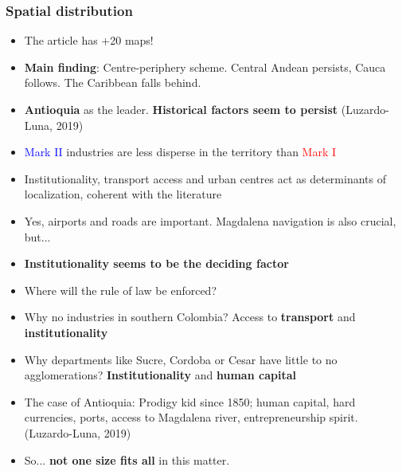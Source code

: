 \documentclass{beamer}
\begin{document}
	\begin{frame}[allowframebreaks]
		\frametitle{Spatial distribution}
		\begin{itemize}
			\item The article has +20 maps!
			\item \textbf{Main finding}: Centre-periphery scheme. Central Andean persists, Cauca follows. The Caribbean falls behind.
			\item \textbf{Antioquia} as the leader. \textbf{Historical factors seem to persist} (Luzardo-Luna, 2019)
			\item \textcolor{blue}{Mark II} industries are less disperse in the territory than \textcolor{red}{Mark I}
			\item Institutionality, transport access and urban centres act as determinants of localization, coherent with the literature
			\item Yes, airports and roads are important. Magdalena navigation is also crucial, but...
			\framebreak
			\item \textbf{Institutionality seems to be the deciding factor}
			\item Where will the rule of law be enforced?
			\item Why no industries in southern Colombia? Access to \textbf{transport} and \textbf{institutionality}
			\item Why departments like Sucre, Cordoba or Cesar have little to no agglomerations? \textbf{Institutionality} and \textbf{human capital}
			\item The case of Antioquia: Prodigy kid since 1850; human capital, hard currencies, ports, access to Magdalena river, entrepreneurship spirit. (Luzardo-Luna, 2019)
			\item So... \textbf{not one size fits all} in this matter.
		\end{itemize}
	\end{frame}
\end{document}
